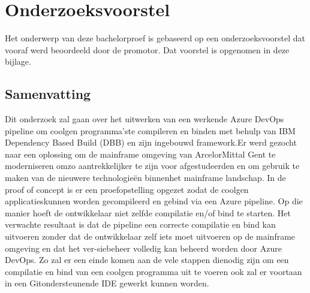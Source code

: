\documentclass[dutch,dit,thesis]{hogentreport}
\begin{document}






%




\appendix

\chapter{Onderzoeksvoorstel}

Het onderwerp van deze bachelorproef is gebaseerd op een onderzoeksvoorstel dat vooraf werd beoordeeld door de promotor. Dat voorstel is opgenomen in deze bijlage.

\section*{Samenvatting}

Dit onderzoek zal gaan over het uitwerken van een werkende Azure DevOps pipeline om coolgen programma’ste compileren en binden met behulp van IBM Dependency Based Build (DBB) en zijn ingebouwd framework.Er werd gezocht naar een oplossing om de mainframe omgeving van ArcelorMittal Gent te moderniseren omzo aantrekkelijker te zijn voor afgestudeerden en om gebruik te maken van de nieuwere technologieën binnenhet mainframe landschap. In de proof of concept is er een proefopstelling opgezet zodat de coolgen applicatieskunnen worden gecompileerd en gebind via een Azure pipeline. Op die manier hoeft de ontwikkelaar niet zelfde compilatie en/of bind te starten. Het verwachte resultaat is dat de pipeline een correcte compilatie en bind kan uitvoeren zonder dat de ontwikkelaar zelf iets moet uitvoeren op de mainframe omgeving en dat het ver-siebeheer volledig kan beheerd worden door Azure DevOps. Zo zal er een einde komen aan de vele stappen dienodig zijn om een compilatie en bind van een coolgen programma uit te voeren ook zal er voortaan in een Gitondersteunende IDE gewerkt kunnen worden.


\end{document}
